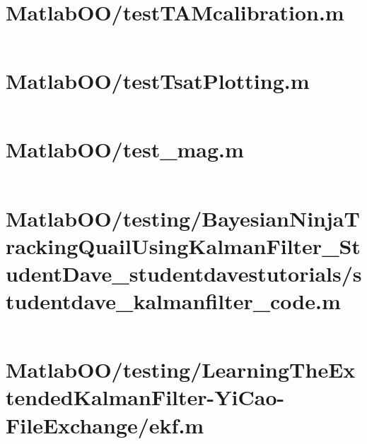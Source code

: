 \pagebreak
\section{MatlabOO/testTAMcalibration.m}\label{code:MatlabOO/testTAMcalibration.m}
\inputminted[linenos,fontsize=\scriptsize]{matlab}{/home/dcouture/git/mathyourlife/TSatPy/beta_versions/matlab_object_oriented/testTAMcalibration.m}

\pagebreak
\section{MatlabOO/testTsatPlotting.m}\label{code:MatlabOO/testTsatPlotting.m}
\inputminted[linenos,fontsize=\scriptsize]{matlab}{/home/dcouture/git/mathyourlife/TSatPy/beta_versions/matlab_object_oriented/testTsatPlotting.m}

\pagebreak
\section{MatlabOO/test\_mag.m}\label{code:MatlabOO/test_mag.m}
\inputminted[linenos,fontsize=\scriptsize]{matlab}{/home/dcouture/git/mathyourlife/TSatPy/beta_versions/matlab_object_oriented/test_mag.m}

\pagebreak
\section{MatlabOO/testing/BayesianNinjaTrackingQuailUsingKalmanFilter\_StudentDave\_studentdavestutorials/studentdave\_kalmanfilter\_code.m}\label{code:MatlabOO/testing/BayesianNinjaTrackingQuailUsingKalmanFilter_StudentDave_studentdavestutorials/studentdave_kalmanfilter_code.m}
\inputminted[linenos,fontsize=\scriptsize]{matlab}{/home/dcouture/git/mathyourlife/TSatPy/beta_versions/matlab_object_oriented/testing/BayesianNinjaTrackingQuailUsingKalmanFilter_StudentDave_studentdavestutorials/studentdave_kalmanfilter_code.m}

\pagebreak
\section{MatlabOO/testing/LearningTheExtendedKalmanFilter-YiCao-FileExchange/ekf.m}\label{code:MatlabOO/testing/LearningTheExtendedKalmanFilter-YiCao-FileExchange/ekf.m}
\inputminted[linenos,fontsize=\scriptsize]{matlab}{/home/dcouture/git/mathyourlife/TSatPy/beta_versions/matlab_object_oriented/testing/LearningTheExtendedKalmanFilter-YiCao-FileExchange/ekf.m}

